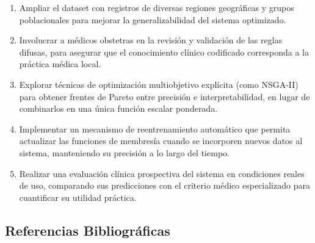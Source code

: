 \documentclass[11pt]{article}
\begin{document}
\begin{enumerate}
    \item Ampliar el dataset con registros de diversas regiones geogr\'aficas y grupos poblacionales para mejorar la generalizabilidad del sistema optimizado.

    \item Involucrar a m\'edicos obstetras en la revisi\'on y validaci\'on de las reglas difusas, para asegurar que el conocimiento cl\'inico codificado corresponda a la pr\'actica m\'edica local.

    \item Explorar t\'ecnicas de optimizaci\'on multiobjetivo expl\'icita (como NSGA-II) para obtener frentes de Pareto entre precisi\'on e interpretabilidad, en lugar de combinarlos en una \'unica funci\'on escalar ponderada.

    \item Implementar un mecanismo de reentrenamiento autom\'atico que permita actualizar las funciones de membres\'ia cuando se incorporen nuevos datos al sistema, manteniendo su precisi\'on a lo largo del tiempo.

    \item Realizar una evaluaci\'on cl\'inica prospectiva del sistema en condiciones reales de uso, comparando sus predicciones con el criterio m\'edico especializado para cuantificar su utilidad pr\'actica.
\end{enumerate}



\subsection{Referencias Bibliográficas}
\end{document}
